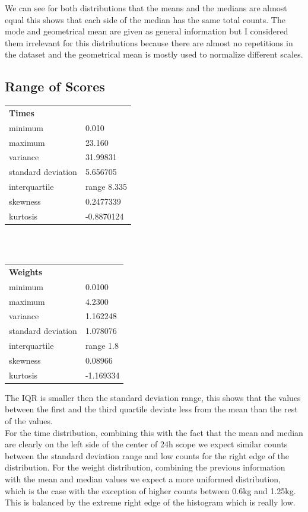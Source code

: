 \documentclass[12pt]{article} %
\begin{document}
We can see for both distributions that the means and the medians are almost equal this shows that each side of the median has the same total counts. The mode and geometrical mean are given as general information but I considered them irrelevant for this distributions because there are almost no repetitions in the dataset and the geometrical mean is mostly used to normalize different scales.\cite{mode}\cite{Geometric:mean}
\subsection{Range of Scores}
\begin{multicols}{2}
\begin{tabular}{ll}
\textbf{Times}&\\
minimum& 0.010\\
maximum& 23.160\\
variance& 31.99831\\
standard deviation& 5.656705\\
interquartile& range 8.335\\
skewness& 0.2477339\\
kurtosis& -0.8870124\\
\end{tabular}
\\\\
\begin{tabular}{ll}
\textbf{Weights}&\\
minimum& 0.0100\\
maximum& 4.2300\\
variance& 1.162248\\
standard deviation& 1.078076\\
interquartile& range 1.8\\
skewness& 0.08966\\
kurtosis& -1.169334\\
\end{tabular}
\end{multicols}
The IQR is smaller then the standard deviation range, this shows that the values between the first and the third quartile deviate less from the mean than the rest of the values. \\
For the time distribution, combining this with the fact that the mean and median are clearly on the left side of the center of 24h scope we expect similar counts between the standard deviation range and low counts for the right edge of the distribution.
For the weight distribution, combining the previous information with the mean and median values we expect a more uniformed distribution, which is the case with the exception of higher counts between 0.6kg and 1.25kg. This is balanced by the extreme right edge of the histogram which is really low.\cite{Standard_deviation}
\end{document}
